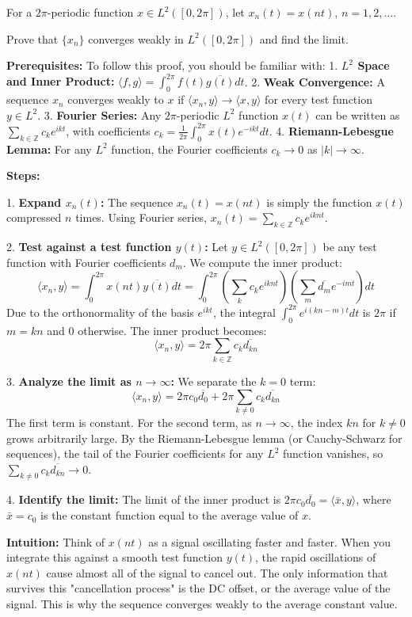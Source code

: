 \begin{exercise}
\label{analysis:2023:4}
For a $2\pi$-periodic function $x\in L^2([0,2\pi])$, let $x_n(t) = x(nt)$, $n=1,2,\ldots$.

Prove that $\{x_n\}$ converges weakly in $L^2([0,2\pi])$ and find the limit.
\end{exercise}

\begin{solution}
\textbf{Prerequisites:}
To follow this proof, you should be familiar with:
1. \textbf{$L^2$ Space and Inner Product:} $\langle f, g \rangle = \int_0^{2\pi} f(t) \overline{g(t)} dt$.
2. \textbf{Weak Convergence:} A sequence $x_n$ converges weakly to $x$ if $\langle x_n, y \rangle \to \langle x, y \rangle$ for every test function $y \in L^2$.
3. \textbf{Fourier Series:} Any $2\pi$-periodic $L^2$ function $x(t)$ can be written as $\sum_{k \in \mathbb{Z}} c_k e^{ikt}$, with coefficients $c_k = \frac{1}{2\pi} \int_0^{2\pi} x(t) e^{-ikt} dt$.
4. \textbf{Riemann-Lebesgue Lemma:} For any $L^2$ function, the Fourier coefficients $c_k \to 0$ as $|k| \to \infty$.

\textbf{Steps:}

1. \textbf{Expand $x_n(t)$:}
The sequence $x_n(t) = x(nt)$ is simply the function $x(t)$ compressed $n$ times. Using Fourier series, $x_n(t) = \sum_{k \in \mathbb{Z}} c_k e^{iknt}$.

2. \textbf{Test against a test function $y(t)$:}
Let $y \in L^2([0, 2\pi])$ be any test function with Fourier coefficients $d_m$. We compute the inner product:
\[ \langle x_n, y \rangle = \int_0^{2\pi} x(nt) \overline{y(t)} dt = \int_0^{2\pi} \left( \sum_k c_k e^{iknt} \right) \left( \sum_m \overline{d_m} e^{-imt} \right) dt \]
Due to the orthonormality of the basis $e^{ikt}$, the integral $\int_0^{2\pi} e^{i(kn-m)t} dt$ is $2\pi$ if $m = kn$ and $0$ otherwise. The inner product becomes:
\[ \langle x_n, y \rangle = 2\pi \sum_{k \in \mathbb{Z}} c_k \overline{d_{kn}} \]

3. \textbf{Analyze the limit as $n \to \infty$:}
We separate the $k=0$ term:
\[ \langle x_n, y \rangle = 2\pi c_0 \overline{d_0} + 2\pi \sum_{k \neq 0} c_k \overline{d_{kn}} \]
The first term is constant. For the second term, as $n \to \infty$, the index $kn$ for $k \neq 0$ grows arbitrarily large. By the Riemann-Lebesgue lemma (or Cauchy-Schwarz for sequences), the tail of the Fourier coefficients for any $L^2$ function vanishes, so $\sum_{k \neq 0} c_k \overline{d_{kn}} \to 0$.

4. \textbf{Identify the limit:}
The limit of the inner product is $2\pi c_0 \overline{d_0} = \langle \bar{x}, y \rangle$, where $\bar{x} = c_0$ is the constant function equal to the average value of $x$.

\textbf{Intuition:}
Think of $x(nt)$ as a signal oscillating faster and faster. When you integrate this against a smooth test function $y(t)$, the rapid oscillations of $x(nt)$ cause almost all of the signal to cancel out. The only information that survives this "cancellation process" is the DC offset, or the average value of the signal. This is why the sequence converges weakly to the average constant value.
\end{solution}

